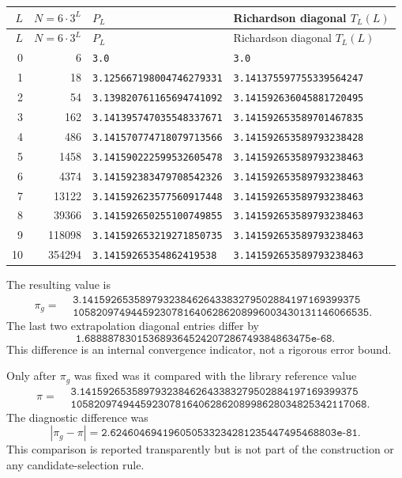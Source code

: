 \documentclass[11pt]{article}
\newcommand{\pig}{\pi_g}
\begin{document}
\begin{longtable}{r r >{\raggedleft\arraybackslash}p{} >{\raggedleft\arraybackslash}p{}}
\toprule
$L$ & $N=6\cdot3^L$ & $P_L$ & Richardson diagonal $T_L(L)$ \\
\midrule
\endfirsthead
\toprule
$L$ & $N=6\cdot3^L$ & $P_L$ & Richardson diagonal $T_L(L)$ \\
\midrule
\endhead
0 & 6 & \texttt{3.0} & \texttt{3.0} \\
1 & 18 & \texttt{3.125667198004746279331} & \texttt{3.141375597755339564247} \\
2 & 54 & \texttt{3.139820761165694741092} & \texttt{3.141592636045881720495} \\
3 & 162 & \texttt{3.141395747035548337671} & \texttt{3.141592653589701467835} \\
4 & 486 & \texttt{3.141570774718079713566} & \texttt{3.141592653589793238428} \\
5 & 1458 & \texttt{3.141590222599532605478} & \texttt{3.141592653589793238463} \\
6 & 4374 & \texttt{3.141592383479708542326} & \texttt{3.141592653589793238463} \\
7 & 13122 & \texttt{3.141592623577560917448} & \texttt{3.141592653589793238463} \\
8 & 39366 & \texttt{3.141592650255100749855} & \texttt{3.141592653589793238463} \\
9 & 118098 & \texttt{3.141592653219271850735} & \texttt{3.141592653589793238463} \\
10 & 354294 & \texttt{3.14159265354862419538} & \texttt{3.141592653589793238463} \\
\bottomrule
\end{longtable}

The resulting value is
\[
\pig=
\begin{aligned}
&\texttt{3.141592653589793238462643383279502884197169399375}\\
&\texttt{105820974944592307816406286208996003430131146066535}.
\end{aligned}
\]
The last two extrapolation diagonal entries differ by
\[
\texttt{1.688887830153689364524207286749384863475e-68}.
\]
This difference is an internal convergence indicator, not a rigorous error bound.

Only after $\pig$ was fixed was it compared with the library reference value
\[
\pi=
\begin{aligned}
&\texttt{3.141592653589793238462643383279502884197169399375}\\
&\texttt{105820974944592307816406286208998628034825342117068}.
\end{aligned}
\]
The diagnostic difference was
\[
|\pig-\pi|=\texttt{2.624604694196050533234281235447495468803e-81}.
\]
This comparison is reported transparently but is not part of the construction or any candidate-selection rule.
\end{document}
